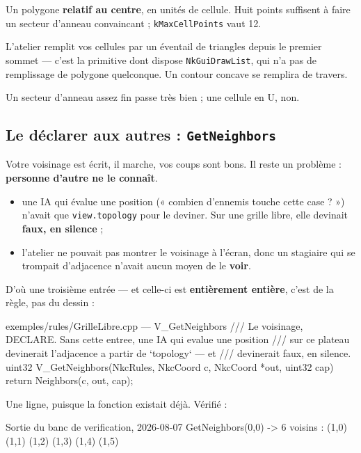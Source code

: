 Un polygone \textbf{relatif au centre}, en unités de cellule. Huit points
suffisent à faire un secteur d'anneau convaincant ;
\texttt{kMaxCellPoints} vaut 12.

\begin{nkpiege}
L'atelier remplit vos cellules par un éventail de triangles depuis le premier
sommet — c'est la primitive dont dispose \texttt{NkGuiDrawList}, qui n'a pas de
remplissage de polygone quelconque. Un contour concave se remplira de travers.

Un secteur d'anneau assez fin passe très bien ; une cellule en U, non.
\end{nkpiege}

\subsection{Le déclarer aux autres : \texttt{GetNeighbors}}

Votre voisinage est écrit, il marche, vos coups sont bons. Il reste un problème :
\textbf{personne d'autre ne le connaît}.

\begin{itemize}
  \item une IA qui évalue une position (« combien d'ennemis touche cette
        case ? ») n'avait que \texttt{view.topology} pour le deviner. Sur une
        grille libre, elle devinait \textbf{faux, en silence} ;
  \item l'atelier ne pouvait pas montrer le voisinage à l'écran, donc un
        stagiaire qui se trompait d'adjacence n'avait aucun moyen de le
        \textbf{voir}.
\end{itemize}

D'où une troisième entrée — et celle-ci est \textbf{entièrement entière}, c'est
de la règle, pas du dessin :

\begin{nkcode}{exemples/rules/GrilleLibre.cpp — V\_GetNeighbors}
/// Le voisinage, DECLARE. Sans cette entree, une IA qui evalue une position
/// sur ce plateau devinerait l'adjacence a partir de `topology` — et
/// devinerait faux, en silence.
uint32 V_GetNeighbors(NkcRules, NkcCoord c, NkcCoord *out, uint32 cap) {
    return Neighbors(c, out, cap);
}
\end{nkcode}

Une ligne, puisque la fonction existait déjà. Vérifié :

\begin{nkcode}{Sortie du banc de verification, 2026-08-07}
GetNeighbors(0,0) -> 6 voisins : (1,0) (1,1) (1,2) (1,3) (1,4) (1,5)
\end{nkcode}

